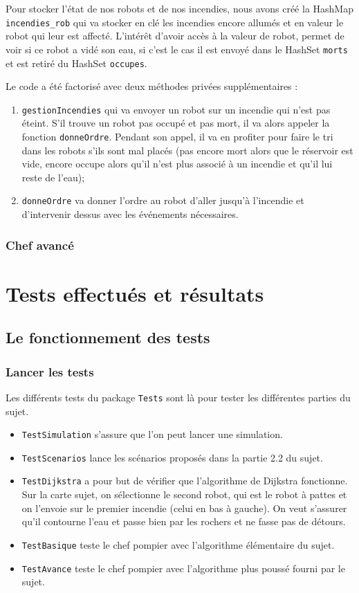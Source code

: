 \documentclass[a4paper,8pt]{article} %
\begin{document}
Pour stocker l'état de nos robots et de nos incendies, nous avons créé la HashMap \texttt{incendies\_rob} 
qui va stocker en clé les incendies encore allumés et en valeur le robot qui leur est affecté. L'intérêt d'avoir accès à la valeur de robot,
permet de voir si ce robot a vidé son eau, si c'est le cas il est envoyé dans le HashSet \texttt{morts} et est retiré du HashSet \texttt{occupes}.

Le code a été factorisé avec deux méthodes privées supplémentaires :
\begin{enumerate}
    \item \texttt{gestionIncendies} qui va envoyer un robot sur un incendie qui n'est pas éteint. S'il trouve un robot pas occupé et pas mort,
    il va alors appeler la fonction \texttt{donneOrdre}. Pendant son appel, il va en profiter pour faire le tri dans les robots s'ils sont
    mal placés (pas encore mort alors que le réservoir est vide, encore occupe alors qu'il n'est plus associé à un incendie et qu'il lui reste
    de l'eau);
    \item \texttt{donneOrdre} va donner l'ordre au robot d'aller jusqu'à l'incendie et d'intervenir dessus avec les événements nécessaires.
\end{enumerate}

\subsubsection{Chef avancé}
\section{Tests effectués et résultats}
\subsection{Le fonctionnement des tests}
\subsubsection{Lancer les tests}
Les différents tests du package \texttt{Tests} sont là pour tester les différentes parties du sujet.
\begin{itemize}
    \item \texttt{TestSimulation} s'assure que l'on peut lancer une simulation.
    \item \texttt{TestScenarios} lance les scénarios proposés dans la partie 2.2 du sujet.
    \item \texttt{TestDijkstra} a pour but de vérifier que l'algorithme de Dijkstra fonctionne. Sur la carte sujet, 
    on sélectionne le second robot, qui est le robot à pattes et on l'envoie sur le premier incendie (celui en bas à gauche).
    On veut s'assurer qu'il contourne l'eau et passe bien par les rochers et ne fasse pas de détours.
    \item \texttt{TestBasique} teste le chef pompier avec l'algorithme élémentaire du sujet.
    \item \texttt{TestAvance} teste le chef pompier avec l'algorithme plus poussé fourni par le sujet.
\end{itemize}
\end{document}
